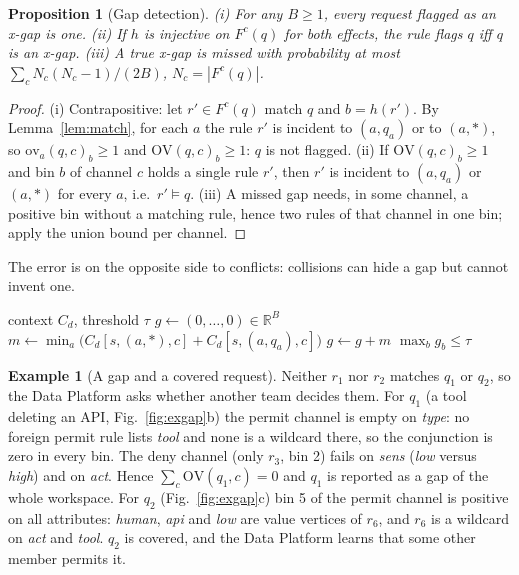 \documentclass[preprint,12pt]{elsarticle}
\newtheorem{proposition}{Proposition}
\theoremstyle{definition}
\newtheorem{example}{Example}
\begin{document}
\begin{proposition}[Gap detection]
\label{thm:gap}
(i) For any $B\ge1$, every request flagged as an x-gap is one. (ii) If $h$ is injective on $F^{c}(q)$ for both effects, the rule flags $q$ iff $q$ is an x-gap. (iii) A true x-gap is missed with probability at most $\sum_c N_c(N_c-1)/(2B)$, $N_c=|F^c(q)|$.
\end{proposition}
\begin{proof}
(i) Contrapositive: let $r'\in F^c(q)$ match $q$ and $b=h(r')$. By Lemma~\ref{lem:match}, for each $a$ the rule $r'$ is incident to $(a,q_a)$ or to $(a,\ast)$, so $\mathrm{ov}_a(q,c)_b\ge1$ and $\mathrm{OV}(q,c)_b\ge1$: $q$ is not flagged. (ii) If $\mathrm{OV}(q,c)_b\ge1$ and bin $b$ of channel $c$ holds a single rule $r'$, then $r'$ is incident to $(a,q_a)$ or $(a,\ast)$ for every $a$, i.e.\ $r'\models q$. (iii) A missed gap needs, in some channel, a positive bin without a matching rule, hence two rules of that channel in one bin; apply the union bound per channel.
\end{proof}
The error is on the opposite side to conflicts: collisions can hide a gap but cannot invent one.

\begin{algorithm}[t]
\caption{\textsc{DetectGap} at domain $d$ for a request $q$ in scope $s$ that no rule of $P_d$ matches}
\label{alg:gap}
\begin{algorithmic}[1]
\Require context $C_d$, threshold $\tau$
\State $g\gets(0,\dots,0)\in\mathbb{R}^B$
  \State $m\gets\min_{a}\big(C_d[s,(a,\ast),c]+C_d[s,(a,q_a),c]\big)$ 
  \State $g\gets g+m$
\EndFor
\State \Return $\max_b g_b\le\tau$
\end{algorithmic}
\end{algorithm}

\begin{example}[A gap and a covered request]
\label{ex:gap}
Neither $r_1$ nor $r_2$ matches $q_1$ or $q_2$, so the Data Platform asks whether another team decides them. For $q_1$ (a tool deleting an API, Fig.~\ref{fig:exgap}b) the permit channel is empty on \textit{type}: no foreign permit rule lists \emph{tool} and none is a wildcard there, so the conjunction is zero in every bin. The deny channel (only $r_3$, bin 2) fails on \textit{sens} (\emph{low} versus \emph{high}) and on \textit{act}. Hence $\sum_c\mathrm{OV}(q_1,c)=0$ and $q_1$ is reported as a gap of the whole workspace. For $q_2$ (Fig.~\ref{fig:exgap}c) bin 5 of the permit channel is positive on all attributes: \emph{human}, \emph{api} and \emph{low} are value vertices of $r_6$, and $r_6$ is a wildcard on \textit{act} and \textit{tool}. $q_2$ is covered, and the Data Platform learns that some other member permits it.
\end{example}
\end{document}
